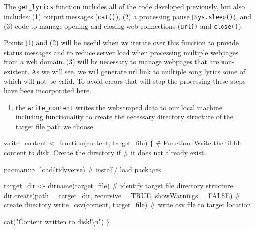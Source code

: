 \documentclass[
  letterpaper,
]{latex/krantz}
\newenvironment{Shaded}{\begin{snugshade}}{\end{snugshade}}
\newcommand{\AttributeTok}[1]{\textcolor[rgb]{0.40,0.45,0.13}{#1}}
\newcommand{\CommentTok}[1]{\textcolor[rgb]{0.37,0.37,0.37}{#1}}
\newcommand{\ConstantTok}[1]{\textcolor[rgb]{0.56,0.35,0.01}{#1}}
\newcommand{\ControlFlowTok}[1]{\textcolor[rgb]{0.00,0.23,0.31}{#1}}
\newcommand{\FunctionTok}[1]{\textcolor[rgb]{0.28,0.35,0.67}{#1}}
\newcommand{\NormalTok}[1]{\textcolor[rgb]{0.00,0.23,0.31}{#1}}
\newcommand{\OtherTok}[1]{\textcolor[rgb]{0.00,0.23,0.31}{#1}}
\newcommand{\SpecialCharTok}[1]{\textcolor[rgb]{0.37,0.37,0.37}{#1}}
\newcommand{\StringTok}[1]{\textcolor[rgb]{0.13,0.47,0.30}{#1}}
\providecommand{\tightlist}{%
  \setlength{\itemsep}{0pt}\setlength{\parskip}{0pt}}\usepackage{longtable,booktabs,array}
\begin{document}
\begin{tcolorbox}[enhanced jigsaw, toprule=.15mm, bottomtitle=1mm, coltitle=black, title=\textcolor{quarto-callout-warning-color}{\faExclamationTriangle}\hspace{0.5em}{Tip}, left=2mm, colframe=quarto-callout-warning-color-frame, bottomrule=.15mm, colbacktitle=quarto-callout-warning-color!10!white, leftrule=.75mm, colback=white, titlerule=0mm, breakable, toptitle=1mm, opacityback=0, arc=.35mm, rightrule=.15mm, opacitybacktitle=0.6]

The \texttt{get\_lyrics} function includes all of the code developed
previously, but also includes: (1) output messages (\texttt{cat()}), (2)
a processing pause (\texttt{Sys.sleep()}), and (3) code to manage
opening and closing web connections (\texttt{url()} and
\texttt{close()}).

Points (1) and (2) will be useful when we iterate over this function to
provide status messages and to reduce server load when processing
multiple webpages from a web domain. (3) will be necessary to manage
webpages that are non-existent. As we will see, we will generate url
link to multiple song lyrics some of which will not be valid. To avoid
errors that will stop the processing these steps have been incorporated
here.

\end{tcolorbox}

\begin{enumerate}
\def\labelenumi{\arabic{enumi}.}
\setcounter{enumi}{1}
\tightlist
\item
  the \texttt{write\_content} writes the webscraped data to our local
  machine, including functionality to create the necessary directory
  structure of the target file path we choose.
\end{enumerate}

\begin{Shaded}
\begin{Highlighting}[]
\NormalTok{write\_content }\OtherTok{\textless{}{-}} \ControlFlowTok{function}\NormalTok{(content, target\_file) \{}
  \CommentTok{\# Function: Write the tibble content to disk. Create the directory if}
  \CommentTok{\# it does not already exist.}
  
\NormalTok{  pacman}\SpecialCharTok{::}\FunctionTok{p\_load}\NormalTok{(tidyverse) }\CommentTok{\# install/ load packages}
  
\NormalTok{  target\_dir }\OtherTok{\textless{}{-}} \FunctionTok{dirname}\NormalTok{(target\_file) }\CommentTok{\# identify target file directory structure}
  \FunctionTok{dir.create}\NormalTok{(}\AttributeTok{path =}\NormalTok{ target\_dir, }\AttributeTok{recursive =} \ConstantTok{TRUE}\NormalTok{, }\AttributeTok{showWarnings =} \ConstantTok{FALSE}\NormalTok{) }\CommentTok{\# create directory}
  \FunctionTok{write\_csv}\NormalTok{(content, target\_file) }\CommentTok{\# write csv file to target location}
  
  \FunctionTok{cat}\NormalTok{(}\StringTok{"Content written to disk!}\SpecialCharTok{\textbackslash{}n}\StringTok{"}\NormalTok{)}
\NormalTok{\}}
\end{Highlighting}
\end{Shaded}
\end{document}
